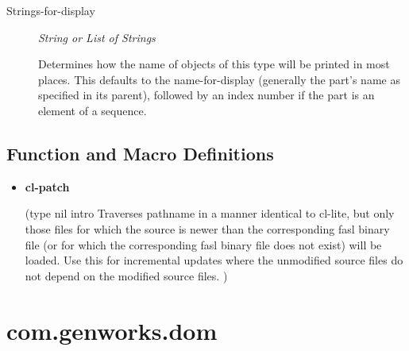 \documentclass [11pt]{book}
\begin{document}
\begin{itemize}
\begin{description}

\item [Strings-for-display]
\emph{String or List of Strings}

 Determines how the name of objects of
this type will be printed in most places.  This defaults to the
name-for-display (generally the part's name as specified in its
parent), followed by an index number if the part is an element of a
sequence.




\end{description}







\end{itemize}



\subsection{Function and Macro Definitions}

\label{subsec:functionandmacrodefinitions}



\begin{itemize}

\item {}
\label{prim:cl-patch}
\textbf{cl-patch}

(type nil intro 
Traverses pathname in a manner identical to cl-lite, but only those
files for which the source is newer than the corresponding fasl
binary file (or for which the corresponding fasl binary file does
not exist) will be loaded. Use this for incremental updates where
the unmodified source files do not depend on the modified source
files.
)



\end{itemize}





\section{com.genworks.dom }

\label{sec:com.genworks.dom}
\end{document}
